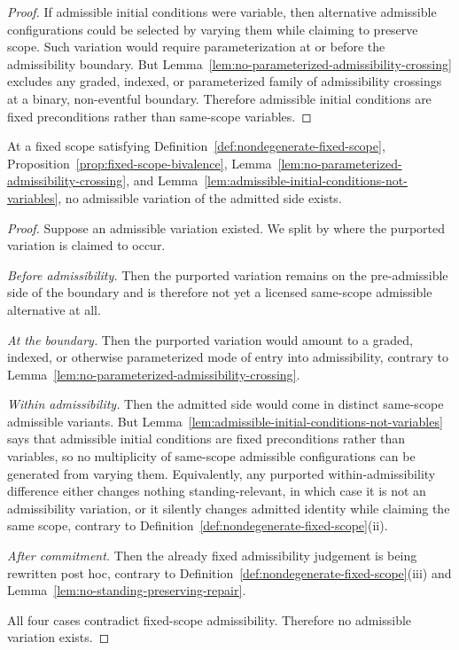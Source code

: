 \begin{proof}
If admissible initial conditions were variable, then alternative admissible configurations could be selected by varying them while claiming to preserve scope. Such variation would require parameterization at or before the admissibility boundary. But Lemma~\ref{lem:no-parameterized-admissibility-crossing} excludes any graded, indexed, or parameterized family of admissibility crossings at a binary, non-eventful boundary. Therefore admissible initial conditions are fixed preconditions rather than same-scope variables.
\end{proof}

\begin{lemma}\label{lem:no-admissible-variation-fixed-scope}
At a fixed scope satisfying Definition~\ref{def:nondegenerate-fixed-scope}, Proposition~\ref{prop:fixed-scope-bivalence}, Lemma~\ref{lem:no-parameterized-admissibility-crossing}, and Lemma~\ref{lem:admissible-initial-conditions-not-variables}, no admissible variation of the admitted side exists.
\end{lemma}

\begin{proof}
Suppose an admissible variation existed. We split by where the purported variation is claimed to occur.

\emph{Before admissibility.} Then the purported variation remains on the pre-admissible side of the boundary and is therefore not yet a licensed same-scope admissible alternative at all.

\emph{At the boundary.} Then the purported variation would amount to a graded, indexed, or otherwise parameterized mode of entry into admissibility, contrary to Lemma~\ref{lem:no-parameterized-admissibility-crossing}.

\emph{Within admissibility.} Then the admitted side would come in distinct same-scope admissible variants. But Lemma~\ref{lem:admissible-initial-conditions-not-variables} says that admissible initial conditions are fixed preconditions rather than variables, so no multiplicity of same-scope admissible configurations can be generated from varying them. Equivalently, any purported within-admissibility difference either changes nothing standing-relevant, in which case it is not an admissibility variation, or it silently changes admitted identity while claiming the same scope, contrary to Definition~\ref{def:nondegenerate-fixed-scope}(ii).

\emph{After commitment.} Then the already fixed admissibility judgement is being rewritten post hoc, contrary to Definition~\ref{def:nondegenerate-fixed-scope}(iii) and Lemma~\ref{lem:no-standing-preserving-repair}.

All four cases contradict fixed-scope admissibility. Therefore no admissible variation exists.
\end{proof}

